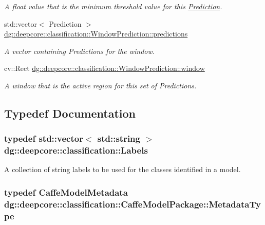 \begin{DoxyCompactItemize}
\begin{DoxyCompactList}\small\item\em A float value that is the minimum threshold value for this \hyperlink{structdg_1_1deepcore_1_1classification_1_1_prediction}{Prediction}. \end{DoxyCompactList}\item 
std\+::vector$<$ Prediction $>$ \hyperlink{group___classification_module_gaaec179dc0e22d9c897260b650c2a6b82}{dg\+::deepcore\+::classification\+::\+Window\+Prediction\+::predictions}
\begin{DoxyCompactList}\small\item\em A vector containing Predictions for the window. \end{DoxyCompactList}\item 
cv\+::\+Rect \hyperlink{group___classification_module_ga200902328358f2246a5e62d390e57278}{dg\+::deepcore\+::classification\+::\+Window\+Prediction\+::window}
\begin{DoxyCompactList}\small\item\em A window that is the active region for this set of Predictions. \end{DoxyCompactList}\end{DoxyCompactItemize}


\subsection{Typedef Documentation}
\subsubsection[{\texorpdfstring{Labels}{Labels}}]{\setlength{\rightskip}{0pt plus 5cm}typedef std\+::vector$<$ std\+::string $>$ {\bf dg\+::deepcore\+::classification\+::\+Labels}}\hypertarget{group___classification_module_ga4c4d47162fed299b627f2e9d17381866}{}\label{group___classification_module_ga4c4d47162fed299b627f2e9d17381866}


A collection of string labels to be used for the classes identified in a model. 

\subsubsection[{\texorpdfstring{Metadata\+Type}{MetadataType}}]{\setlength{\rightskip}{0pt plus 5cm}typedef Caffe\+Model\+Metadata {\bf dg\+::deepcore\+::classification\+::\+Caffe\+Model\+Package\+::\+Metadata\+Type}}\hypertarget{group___classification_module_gae0f23f2d134e0b3fc83b807077e32e8b}{}\label{group___classification_module_gae0f23f2d134e0b3fc83b807077e32e8b}


